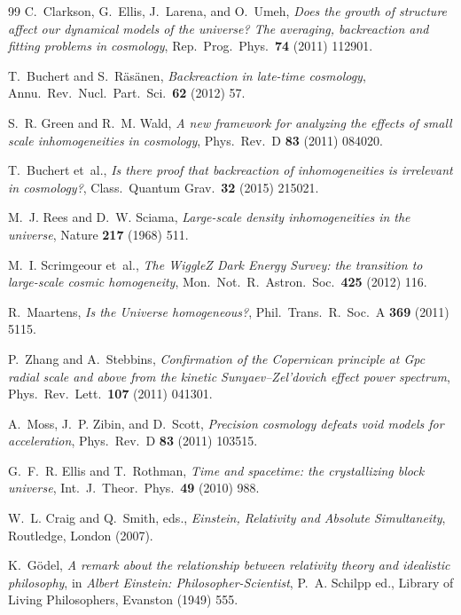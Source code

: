 \documentclass[11pt,a4paper]{article}
\begin{document}
\begin{thebibliography}{99}
C.~Clarkson, G.~Ellis, J.~Larena, and O.~Umeh,
\emph{Does the growth of structure affect our dynamical models of the universe? The averaging, backreaction and fitting problems in cosmology},
Rep.~Prog.~Phys.~\textbf{74} (2011) 112901.

T.~Buchert and S.~R\"as\"anen,
\emph{Backreaction in late-time cosmology},
Annu.~Rev.~Nucl.~Part.~Sci.~\textbf{62} (2012) 57.

S.~R. Green and R.~M. Wald,
\emph{A new framework for analyzing the effects of small scale inhomogeneities in cosmology},
Phys.~Rev.~D \textbf{83} (2011) 084020.

T.~Buchert et~al.,
\emph{Is there proof that backreaction of inhomogeneities is irrelevant in cosmology?},
Class.~Quantum Grav.~\textbf{32} (2015) 215021.

M.~J. Rees and D.~W. Sciama,
\emph{Large-scale density inhomogeneities in the universe},
Nature \textbf{217} (1968) 511.

M.~I. Scrimgeour et~al.,
\emph{The WiggleZ Dark Energy Survey: the transition to large-scale cosmic homogeneity},
Mon.~Not.~R.~Astron.~Soc.~\textbf{425} (2012) 116.

R.~Maartens,
\emph{Is the Universe homogeneous?},
Phil.~Trans.~R.~Soc.~A \textbf{369} (2011) 5115.

P.~Zhang and A.~Stebbins,
\emph{Confirmation of the Copernican principle at Gpc radial scale and above from the kinetic Sunyaev--Zel'dovich effect power spectrum},
Phys.~Rev.~Lett.~\textbf{107} (2011) 041301.

A.~Moss, J.~P. Zibin, and D.~Scott,
\emph{Precision cosmology defeats void models for acceleration},
Phys.~Rev.~D \textbf{83} (2011) 103515.

G.~F.~R. Ellis and T.~Rothman,
\emph{Time and spacetime: the crystallizing block universe},
Int.~J.~Theor.~Phys.~\textbf{49} (2010) 988.

W.~L. Craig and Q.~Smith, eds.,
\emph{Einstein, Relativity and Absolute Simultaneity},
Routledge, London (2007).

K.~G\"odel,
\emph{A remark about the relationship between relativity theory and idealistic philosophy},
in \emph{Albert Einstein: Philosopher-Scientist}, P.~A. Schilpp ed., Library of Living Philosophers, Evanston (1949) 555.


\end{thebibliography}
\end{document}
